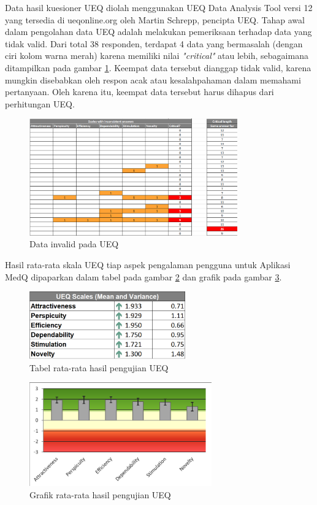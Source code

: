 Data hasil kuesioner UEQ diolah menggunakan UEQ Data Analysis Tool versi 12 yang tersedia di ueqonline.org oleh Martin Schrepp, pencipta UEQ. 
Tahap awal dalam pengolahan data UEQ adalah melakukan pemeriksaan terhadap data yang tidak valid. 
Dari total 38 responden, terdapat 4 data yang bermasalah (dengan ciri kolom warna merah) karena memiliki nilai \textit{"critical"} atau lebih, sebagaimana ditampilkan pada gambar \ref*{Fig:InvalidUEQ}. 
Keempat data tersebut dianggap tidak valid, karena mungkin disebabkan oleh respon acak atau kesalahpahaman dalam memahami pertanyaan. 
Oleh karena itu, keempat data tersebut harus dihapus dari perhitungan UEQ.
\begin{figure}[H]
	\centering
	\includegraphics[width=0.8\textwidth]{contents/chapter-4/images/invalidUEQ.png}
	\caption{Data invalid pada UEQ}
	\label{Fig:InvalidUEQ}
\end{figure}

Hasil rata-rata skala UEQ tiap aspek pengalaman pengguna untuk Aplikasi 
MedQ dipaparkan dalam tabel pada gambar \ref*{Fig : Tabel Skor UEQ} dan grafik pada gambar \ref*{Fig : Gambar Skor UEQ }.
\begin{figure}[H]
	\centering
	\includegraphics[width=0.6\textwidth]{contents/chapter-4/images/UEQScore.png}
	\caption{Tabel rata-rata hasil pengujian UEQ}
	\label{Fig : Tabel Skor UEQ}
\end{figure}
\begin{figure}[H]
	\centering
	\includegraphics[width=0.7\textwidth]{contents/chapter-4/images/UEQScore-graph.png}
	\caption{Grafik rata-rata hasil pengujian UEQ}
	\label{Fig : Gambar Skor UEQ }
\end{figure}

